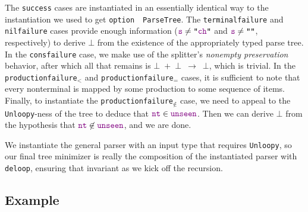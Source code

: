 \documentclass[preprint]{sigplanconf}
\newcommand{\str}[1]{\texttt{"\textcolor{DarkGreen}{#1}"}}
\newcommand{\False}{\ensuremath{\bot}}
\newcommand{\textnbsp}{\ifmmode\else~\fi}
\newcommand{\typesumsep}{\ensuremath{+}}
\newcommand{\typesum}[2]{#1\textnbsp\typesumsep\textnbsp#2}
\newcommand{\fname}[1]{\texttt{#1}}
\newcommand{\farg}[1]{\textcolor{violet}{\texttt{#1}}}
\newcommand{\typeto}{\ensuremath{\to}}
\newcommand{\indname}[1]{\texttt{#1}}
\newcommand{\typeoption}[2][~~]{\indname{option}#1#2}
\def\_{\textunderscore}
\begin{document}
    The \fname{success} cases are instantiated in an essentially identical way to the instantiation we used to get \typeoption{\indname{ParseTree}}.  The \fname{terminal\_failure} and \fname{nil\_failure} cases provide enough information ($\farg{s}\neq\str{\farg{ch}}$ and $\farg{s}\neq\str{}$, respectively) to derive \False{} from the existence of the appropriately typed parse tree.  In the \fname{cons\_failure} case, we make use of the splitter's \emph{nonempty preservation} behavior, after which all that remains is \typesum{\False}{\False}~\typeto~\False, which is trivial.  In the \fname{production\_failure$_<$} and \fname{production\_failure$_=$} cases, it is sufficient to note that every nonterminal is mapped by some production to some sequence of items.  Finally, to instantiate the \fname{production\_failure$_{\not\in}$} case, we need to appeal to the \fname{Unloopy}-ness of the tree to deduce that $\farg{nt}\in \farg{unseen}$.  Then we can derive \False{} from the hypothesis that $\farg{nt}\not\in\farg{unseen}$, and we are done.

    We instantiate the general parser with an input type that requires \fname{Unloopy}, so our final tree minimizer is really the composition of the instantiated parser with \fname{deloop}, ensuring that invariant as we kick off the recursion.

  \subsection{Example} \label{sec:example-min-execution}
\end{document}
